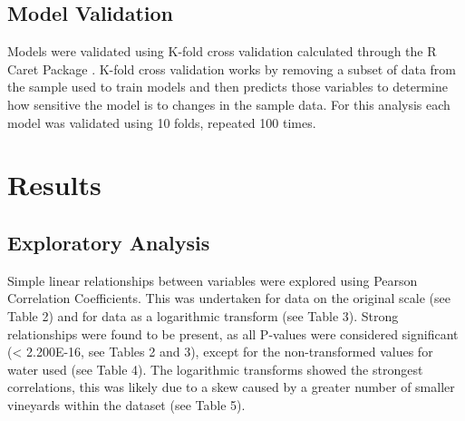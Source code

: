 \documentclass[12pt,australian]{article}
\begin{document}
\begin{sloppypar}
\subsection{Model Validation}
Models were validated using K-fold cross validation calculated through the R Caret Package \autocite{kuhnBuildingPredictiveModels2008}. K-fold cross validation works by removing a subset of data from the sample used to train models and then predicts those variables to determine how sensitive the model is to changes in the sample data. For this analysis each model was validated using 10 folds, repeated 100 times. %

\section{Results}
\subsection{Exploratory Analysis}
Simple linear relationships between variables were explored using Pearson Correlation Coefficients. This was undertaken for data on the original scale (see Table 2) and for data as a logarithmic transform (see Table 3). Strong relationships were found to be present, as all P-values were considered significant (< 2.200E-16, see Tables 2 and 3), except for the non-transformed values for water used (see Table 4). The logarithmic transforms showed the strongest correlations, this was likely due to a skew caused by a greater number of smaller vineyards within the dataset (see Table 5).


\end{sloppypar}
\end{document}
